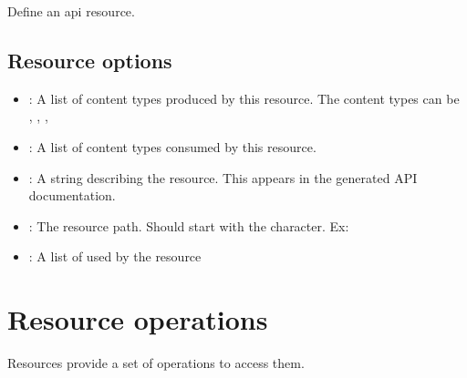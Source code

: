 \documentclass[letterpaper,10pt,english]{sphinxmanual}
\begin{document}

\begin{fulllineitems}
\label{\detokenize{api:macro:rest-server:define-api-resource}}
Define an api resource.

\end{fulllineitems}



\subsection{Resource options}
\label{\detokenize{api:resource-options}}\begin{itemize}
\item {} 
: A list of content types produced by this resource. The content types can be , , , 

\item {} 
: A list of content types consumed by this resource.

\item {} 
: A string describing the resource. This appears in the generated API documentation.

\item {} 
: The resource path. Should start with the \sphinxtitleref{/} character. Ex: 

\item {} 
: A list of  used by the resource

\end{itemize}


\section{Resource operations}
\label{\detokenize{api:resource-operations}}
Resources provide a set of operations to access them.
\end{document}
